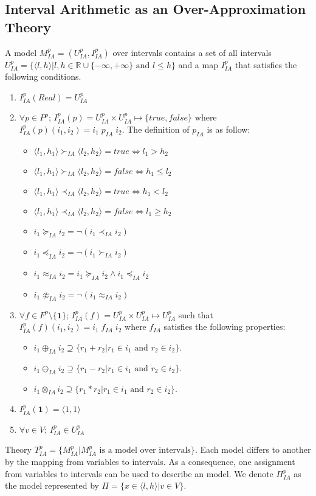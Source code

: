 \subsection{Interval Arithmetic as an Over-Approximation Theory}
A model $M^p_{IA} = (U^p_{IA}, I^p_{IA})$ over intervals contains a set of all intervals $U^p_{IA} = \{\langle l, h\rangle | l, h \in \mathbb{R} \cup \{-\infty, +\infty\} \text{ and } l \le h\}$ and a map $I^p_{IA}$ that satisfies the following conditions.
\begin{enumerate}
\item $I^p_{IA}(Real) = U^p_{IA}$
\item $\forall p \in P^p$; $I^p_{IA}(p)= U^p_{IA} \times U^p_{IA} \mapsto \{true, false\}$ where $I^p_{IA}(p)(i_1, i_2) = i_1 \; p_{IA} \; i_2$. The definition of $ p_{IA}$ is as follow:
\begin{itemize}
\item $\langle l_1, h_1\rangle  \succ_{IA} \langle l_2,  h_2\rangle  = true \iff l_1 > h_2$
\item $\langle l_1, h_1\rangle  \succ_{IA} \langle l_2,  h_2\rangle  = false \iff h_1 \le l_2$
\item $\langle l_1, h_1\rangle  \prec_{IA} \langle l_2,  h_2\rangle  = true \iff h_1 < l_2$
\item $\langle l_1, h_1\rangle  \prec_{IA} \langle l_2,  h_2\rangle  = false \iff l_1 \ge h_2$
\item $i_1 \succeq_{IA} i_2 = \neg(i_1 \prec_{IA} i_2)$
\item $i_1 \preceq_{IA} i_2 = \neg(i_1 \succ_{IA} i_2)$
\item $i_1 \approx_{IA} i_2 = i_1 \succeq_{IA} i_2 \wedge i_1 \preceq_{IA} i_2$
\item $i_1 \not\approx_{IA} i_2 = \neg(i_1 \approx_{IA} i_2)$
\end{itemize}
\item $\forall f \in F^p \setminus \{\mathbf{1}\}$; $I^p_{IA}(f) = U^p_{IA} \times U^p_{IA} \mapsto U^p_{IA}$ such that $ I^p_{IA}(f)(i_1, i_2)= i_1 \; f_{IA} \; i_2$ where $f_{IA}$ satisfies the following properties:
\begin{itemize}
\item $i_1 \oplus_{IA} i_2 \supseteq \{r_1 + r_2| r_1 \in i_1 \text{ and } r_2 \in i_2\}$.
\item $i_1 \ominus_{IA} i_2 \supseteq \{r_1 - r_2| r_1 \in i_1 \text{ and } r_2 \in i_2\}$.
\item $i_1 \otimes_{IA} i_2 \supseteq \{r_1 * r_2| r_1 \in i_1 \text{ and } r_2 \in i_2\}$.
\end{itemize}
\item $I^p_{IA}(\mathbf{1}) = \langle 1,1\rangle $
\item $\forall v \in V$; $I^p_{IA} \in U^p_{IA}$
\end{enumerate}
Theory $T^p_{IA} = \{M^p_{IA}| M^p_{IA} \text{ is a model over intervals}\}$. Each model differs to another by the mapping from variables to intervals. As a consequence, one assignment from variables to intervals can be used to describe an model. We denote $\Pi^p_{IA}$ as the model represented by $\Pi = \{x \in \langle l, h\rangle  | v \in V\}$. 

